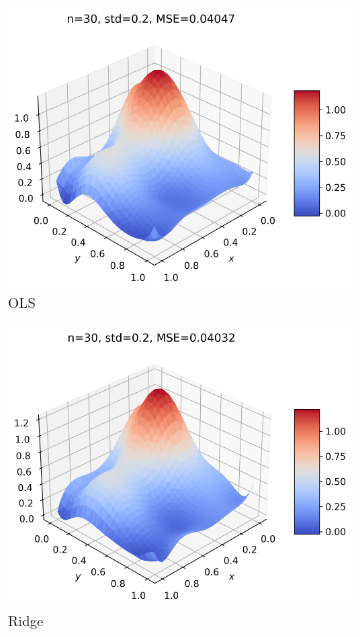 \documentclass[11pt]{article}
\begin{document}
\begin{figure}[H]
  \begin{subfigure}{.5\textwidth}
    \centering
    \includegraphics[width=.92\textwidth]{../figures/test_OLS.png}
    \caption{OLS}
    \label{fig:}
  \end{subfigure}
  \begin{subfigure}{.5\textwidth}
    \centering
    \includegraphics[width=.92\textwidth]{../figures/test_RIDGE.png}
    \caption{Ridge}
    \label{fig:}
  \end{subfigure}
  \begin{subfigure}{.5\textwidth}
    \centering

\end{subfigure}
\end{figure}
\end{document}
